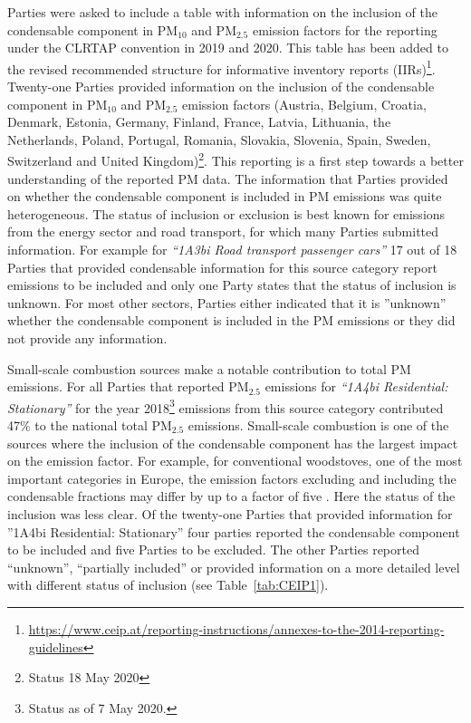 Parties were asked to include a table with information on the inclusion of the condensable component in PM$_{10}$ and PM$_{2.5}$
emission factors for the reporting under the CLRTAP convention in 2019 and 2020. This table has been added to the revised
recommended structure for informative inventory reports (IIRs)\footnote{\url{https://www.ceip.at/reporting-instructions/annexes-to-the-2014-reporting-guidelines}}. Twenty-one Parties
provided information on the inclusion of the condensable component in  PM$_{10}$ and PM$_{2.5}$ emission factors (Austria,
Belgium, Croatia, Denmark, Estonia, Germany, Finland, France, Latvia, Lithuania, the Netherlands, Poland, Portugal, Romania, Slovakia, Slovenia,
Spain, Sweden, Switzerland  and United Kingdom)\footnote{Status 18 May 2020}. This reporting is a first step towards a better understanding of the reported PM data. The information that Parties provided on whether the condensable component is included in PM emissions was quite heterogeneous. The status of inclusion or exclusion is best known for emissions from the energy sector and road transport, for which many Parties submitted information. For example for {\it ``1A3bi Road transport passenger cars''} 17 out of 18 Parties that provided condensable information for this source category report emissions to be included and only one Party states that the status of inclusion is unknown. For most other sectors, Parties either indicated that it is ''unknown'' whether the condensable component is included in the PM emissions or they did not provide any information. 


Small-scale combustion sources make a notable contribution to total PM emissions. For all Parties that reported PM$_{2.5}$
emissions for {\it ``1A4bi Residential: Stationary''} for the year 2018\footnote{ Status as of 7 May 2020.} emissions from this
source category contributed 47\% to the national total PM$_{2.5}$ emissions. Small-scale combustion is one of the sources
where the inclusion of the condensable component has the largest impact on the emission factor. For example, for
conventional woodstoves, one of the most important categories in Europe, the emission factors excluding and including
the condensable fractions may differ by up to a factor of five \citep{DeniervanderGon2015}.  Here the
status of the inclusion was less clear. Of the twenty-one Parties that provided information for ''1A4bi Residential:
Stationary'' four parties reported the condensable component to be included and five Parties to be excluded. The
other Parties reported ``unknown'', ``partially included'' or provided information on a more detailed level with
different status of inclusion (see Table~\ref{tab:CEIP1}).


